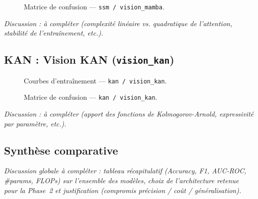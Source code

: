 \begin{figure}[H]
    \centering
    \caption{Matrice de confusion --- \texttt{ssm / vision\_mamba}.}
    \label{fig:cm_ssm_vision_mamba}
\end{figure}


\textit{Discussion : à compléter (complexité linéaire vs. quadratique
de l'attention, stabilité de l'entraînement, etc.).}

\subsection{KAN : Vision KAN (\texttt{vision\_kan})}
\label{subsec:kan_vision_kan}

\begin{figure}[H]
    \centering
    \caption{Courbes d'entraînement --- \texttt{kan / vision\_kan}.}
    \label{fig:hist_kan_vision_kan}
\end{figure}

\begin{figure}[H]
    \centering
    \caption{Matrice de confusion --- \texttt{kan / vision\_kan}.}
    \label{fig:cm_kan_vision_kan}
\end{figure}


\textit{Discussion : à compléter (apport des fonctions de Kolmogorov-Arnold,
expressivité par paramètre, etc.).}

\subsection{Synthèse comparative}
\label{subsec:synthese}

\textit{Discussion globale à compléter : tableau récapitulatif
(Accuracy, F1, AUC-ROC, \#params, FLOPs) sur l'ensemble des modèles,
choix de l'architecture retenue pour la Phase~2 et justification
(compromis précision / coût / généralisation).}
